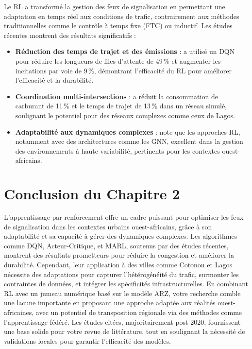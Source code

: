 Le RL a transformé la gestion des feux de signalisation en permettant une adaptation en temps réel aux conditions de trafic, contrairement aux méthodes traditionnelles comme le contrôle à temps fixe (FTC) ou inductif. Les études récentes montrent des résultats significatifs :
\begin{itemize}
    \item \textbf{Réduction des temps de trajet et des émissions} : \cite{reinforcement2024approach} a utilisé un DQN pour réduire les longueurs de files d'attente de 49\,\% et augmenter les incitations par voie de 9\,\%, démontrant l'efficacité du RL pour améliorer l'efficacité et la durabilité.
    \item \textbf{Coordination multi-intersections} : \cite{multiagent2023reinforcement} a réduit la consommation de carburant de 11\,\% et le temps de trajet de 13\,\% dans un réseau simulé, soulignant le potentiel pour des réseaux complexes comme ceux de Lagos.
    \item \textbf{Adaptabilité aux dynamiques complexes} : \cite{survey2025reinforcement} note que les approches RL, notamment avec des architectures comme les GNN, excellent dans la gestion des environnements à haute variabilité, pertinents pour les contextes ouest-africains.
\end{itemize}


\section{Conclusion du Chapitre 2}
\label{sec:rl_conclusion}

L'apprentissage par renforcement offre un cadre puissant pour optimiser les feux de signalisation dans les contextes urbains ouest-africains, grâce à son adaptabilité et sa capacité à gérer des dynamiques complexes. Les algorithmes comme DQN, Acteur-Critique, et MARL, soutenus par des études récentes, montrent des résultats prometteurs pour réduire la congestion et améliorer la durabilité. Cependant, leur application à des villes comme Cotonou et Lagos nécessite des adaptations pour capturer l'hétérogénéité du trafic, surmonter les contraintes de données, et intégrer les spécificités infrastructurelles. En combinant RL avec un jumeau numérique basé sur le modèle ARZ, votre recherche comble une lacune importante en proposant une approche adaptée aux réalités ouest-africaines, avec un potentiel de transposition régionale via des méthodes comme l'apprentissage fédéré. Les études citées, majoritairement post-2020, fournissent une base solide pour votre revue de littérature, tout en soulignant la nécessité de validations locales pour garantir l'efficacité des modèles.
